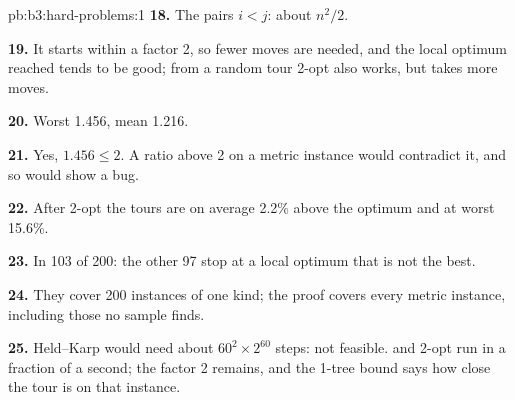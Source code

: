 \begin{solution}{pb:b3:hard-problems:1}
\textbf{18.} The pairs $i < j$: about $n^2/2$.

\textbf{19.} It starts within a factor 2, so fewer moves are needed, and the local optimum reached tends to be good; from a random tour 2-opt also works, but takes more moves.

\textbf{20.} Worst 1.456, mean 1.216.

\textbf{21.} Yes, $1.456 \le 2$. A ratio above 2 on a metric instance would contradict it, and so would show a bug.

\textbf{22.} After 2-opt the tours are on average 2.2\% above the optimum and at worst 15.6\%.

\textbf{23.} In 103 of 200: the other 97 stop at a local optimum that is not the best.

\textbf{24.} They cover 200 instances of one kind; the proof covers every metric instance, including those no sample finds.

\textbf{25.} Held--Karp would need about $60^2 \times 2^{60}$ steps: not feasible.  and 2-opt run in a fraction of a second; the factor 2 remains, and the 1-tree bound says how close the tour is on that instance.
\end{solution}
